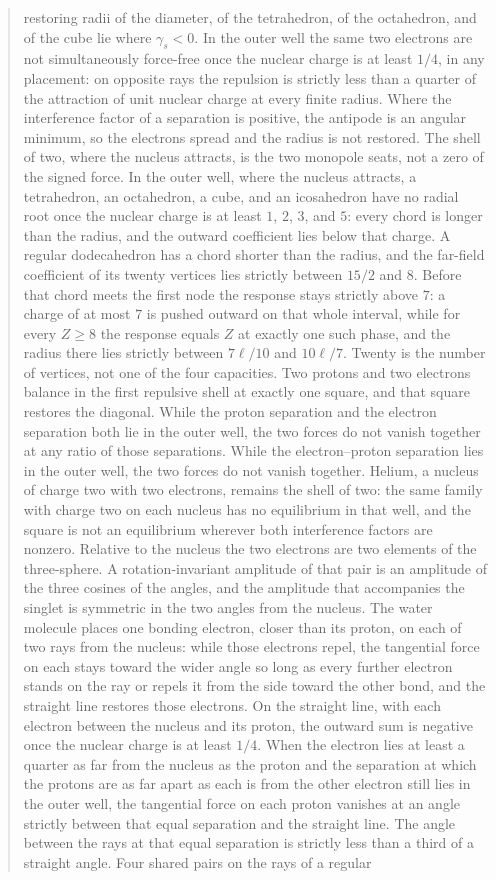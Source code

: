 \documentclass[a4paper]{article}
\begin{document}
\begin{abstract}
restoring radii of the diameter, of the tetrahedron, of the octahedron, and of the cube lie where \(\gamma_s<0\). In the outer well the same two electrons are not simultaneously force-free once the nuclear charge is at least \(1/4\), in any placement: on opposite rays the repulsion is strictly less than a quarter of the attraction of unit nuclear charge at every finite radius. Where the interference factor of a separation is positive, the antipode is an angular minimum, so the electrons spread and the radius is not restored. The shell of two, where the nucleus attracts, is the two monopole seats, not a zero of the signed force. In the outer well, where the nucleus attracts, a tetrahedron, an octahedron, a cube, and an icosahedron have no radial root once the nuclear charge is at least \(1\), \(2\), \(3\), and \(5\): every chord is longer than the radius, and the outward coefficient lies below that charge. A regular dodecahedron has a chord shorter than the radius, and the far-field coefficient of its twenty vertices lies strictly between \(15/2\) and \(8\). Before that chord meets the first node the response stays strictly above \(7\): a charge of at most \(7\) is pushed outward on that whole interval, while for every \(Z\ge 8\) the response equals \(Z\) at exactly one such phase, and the radius there lies strictly between \(7\ell/10\) and \(10\ell/7\). Twenty is the number of vertices, not one of the four capacities. Two protons and two electrons balance in the first repulsive shell at exactly one square, and that square restores the diagonal. While the proton separation and the electron separation both lie in the outer well, the two forces do not vanish together at any ratio of those separations. While the electron--proton separation lies in the outer well, the two forces do not vanish together. Helium, a nucleus of charge two with two electrons, remains the shell of two: the same family with charge two on each nucleus has no equilibrium in that well, and the square is not an equilibrium wherever both interference factors are nonzero. Relative to the nucleus the two electrons are two elements of the three-sphere. A rotation-invariant amplitude of that pair is an amplitude of the three cosines of the angles, and the amplitude that accompanies the singlet is symmetric in the two angles from the nucleus. The water molecule places one bonding electron, closer than its proton, on each of two rays from the nucleus: while those electrons repel, the tangential force on each stays toward the wider angle so long as every further electron stands on the ray or repels it from the side toward the other bond, and the straight line restores those electrons. On the straight line, with each electron between the nucleus and its proton, the outward sum is negative once the nuclear charge is at least \(1/4\). When the electron lies at least a quarter as far from the nucleus as the proton and the separation at which the protons are as far apart as each is from the other electron still lies in the outer well, the tangential force on each proton vanishes at an angle strictly between that equal separation and the straight line. The angle between the rays at that equal separation is strictly less than a third of a straight angle. Four shared pairs on the rays of a regular 
\end{abstract}
\end{document}

